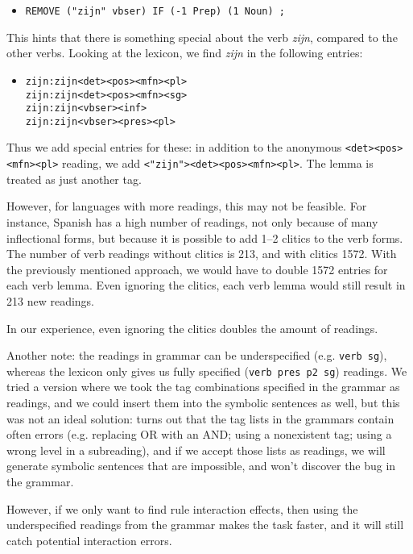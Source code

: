 \begin{itemize}
 \item[] \texttt{REMOVE ("zijn" vbser) IF (-1 Prep) (1 Noun) ;}
\end{itemize}

This hints that there is something special about the verb \emph{zijn}, compared to the other verbs. Looking at the lexicon, we find \emph{zijn} in the following entries:

\begin{itemize}
 \item[] 
\begin{verbatim}zijn:zijn<det><pos><mfn><pl>
zijn:zijn<det><pos><mfn><sg>
zijn:zijn<vbser><inf>
zijn:zijn<vbser><pres><pl>
\end{verbatim}
\end{itemize}

Thus we add special entries for these: in addition to the anonymous
 \texttt{<det><pos><mfn><pl>} reading, we add \texttt{<"zijn"><det><pos><mfn><pl>}. 
The lemma is treated as just another tag.

 However, for languages with more readings, this may not be feasible. For instance, Spanish has a high number of readings, not only because of many inflectional forms, but because it is possible to add 1--2 clitics to the verb forms.
The number of verb readings without clitics is 213, and with clitics 1572.
With the previously mentioned approach, we would have to double 1572 entries for each verb lemma. Even ignoring the clitics, each verb lemma would still result in 213 new readings.

 In our experience,  even ignoring the clitics doubles the amount of readings.

Another note: the readings in grammar can be underspecified (e.g. \texttt{verb sg}), whereas the lexicon only gives us fully specified (\texttt{verb pres p2 sg}) readings. We tried a version where we took the tag combinations specified in the grammar as readings, and we could insert them into the symbolic sentences as well, but this was not an ideal solution: turns out that the tag lists in the grammars contain often errors (e.g. replacing OR with an AND; using a nonexistent tag; using a wrong level in a subreading), and if we accept those lists as readings, we will generate symbolic sentences that are impossible, and won't discover the bug in the grammar.

However, if we only want to find rule interaction effects, then using the underspecified readings from the grammar makes the task faster, and it will still catch potential interaction errors. 



